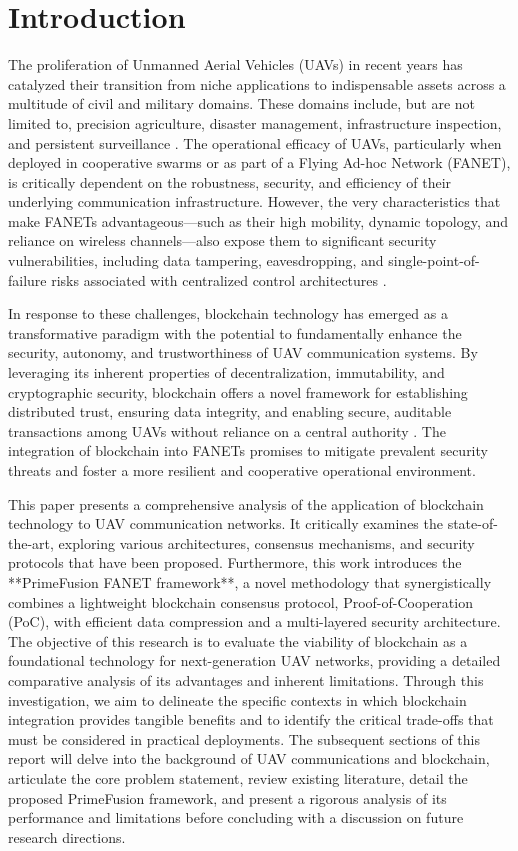 \section{Introduction}
\label{sec:introduction}

The proliferation of Unmanned Aerial Vehicles (UAVs) in recent years has catalyzed their transition from niche applications to indispensable assets across a multitude of civil and military domains. These domains include, but are not limited to, precision agriculture, disaster management, infrastructure inspection, and persistent surveillance \cite{hafeez2023blockchain}. The operational efficacy of UAVs, particularly when deployed in cooperative swarms or as part of a Flying Ad-hoc Network (FANET), is critically dependent on the robustness, security, and efficiency of their underlying communication infrastructure. However, the very characteristics that make FANETs advantageous—such as their high mobility, dynamic topology, and reliance on wireless channels—also expose them to significant security vulnerabilities, including data tampering, eavesdropping, and single-point-of-failure risks associated with centralized control architectures \cite{luo2023escm}.

In response to these challenges, blockchain technology has emerged as a transformative paradigm with the potential to fundamentally enhance the security, autonomy, and trustworthiness of UAV communication systems. By leveraging its inherent properties of decentralization, immutability, and cryptographic security, blockchain offers a novel framework for establishing distributed trust, ensuring data integrity, and enabling secure, auditable transactions among UAVs without reliance on a central authority \cite{jagatheesaperumal2023blockchain}. The integration of blockchain into FANETs promises to mitigate prevalent security threats and foster a more resilient and cooperative operational environment.

This paper presents a comprehensive analysis of the application of blockchain technology to UAV communication networks. It critically examines the state-of-the-art, exploring various architectures, consensus mechanisms, and security protocols that have been proposed. Furthermore, this work introduces the **PrimeFusion FANET framework**, a novel methodology that synergistically combines a lightweight blockchain consensus protocol, Proof-of-Cooperation (PoC), with efficient data compression and a multi-layered security architecture. The objective of this research is to evaluate the viability of blockchain as a foundational technology for next-generation UAV networks, providing a detailed comparative analysis of its advantages and inherent limitations. Through this investigation, we aim to delineate the specific contexts in which blockchain integration provides tangible benefits and to identify the critical trade-offs that must be considered in practical deployments. The subsequent sections of this report will delve into the background of UAV communications and blockchain, articulate the core problem statement, review existing literature, detail the proposed PrimeFusion framework, and present a rigorous analysis of its performance and limitations before concluding with a discussion on future research directions.
